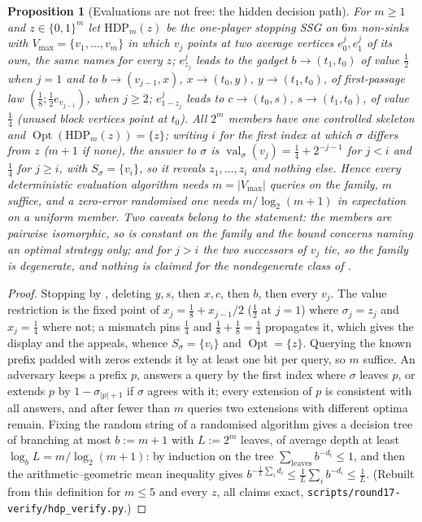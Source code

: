 \documentclass[11pt]{article}
\theoremstyle{plain}
\newtheorem{proposition}[theorem]{Proposition}
\theoremstyle{definition}
\DeclareMathOperator{\val}{val}
\DeclareMathOperator{\Opt}{Opt}
\newcommand{\Vmax}{V_{\max}}
\begin{document}
\begin{proposition}[Evaluations are not free: the hidden decision path]\label{prop:hdp-eval}
For $m\ge1$ and $z\in\{0,1\}^{m}$ let $\mathrm{HDP}_m(z)$ be the one-player
stopping SSG on $6m$ non-sinks with $\Vmax=\{v_1,\dots,v_m\}$ in which $v_j$
points at two average vertices $e^{j}_0,e^{j}_1$ of its own, the same names
for every $z$; $e^{j}_{z_j}$ leads to the gadget $b\to(t_1,t_0)$ of value
$\tfrac12$ when $j=1$ and to $b\to(v_{j-1},x)$, $x\to(t_0,y)$,
$y\to(t_1,t_0)$, of first-passage law $(\tfrac18;\tfrac12e_{v_{j-1}})$,
when $j\ge2$; $e^{j}_{1-z_j}$ leads to $c\to(t_0,s)$, $s\to(t_1,t_0)$, of
value $\tfrac14$ (unused block vertices point at $t_0$). All $2^{m}$
members have one controlled skeleton and $\Opt(\mathrm{HDP}_m(z))=\{z\}$;
writing $i$ for the first index at which $\sigma$ differs from $z$
($m+1$ if none), the answer to $\sigma$ is $\val_\sigma(v_j)=\tfrac14+2^{-j-1}$
for $j<i$ and $\tfrac14$ for $j\ge i$, with $S_\sigma=\{v_i\}$, so it
reveals $z_1,\dots,z_i$ and nothing else. Hence every deterministic
evaluation algorithm needs $m=|\Vmax|$ queries on the family, $m$ suffice,
and a zero-error randomised one needs $m/\log_2(m+1)$ in expectation on a
uniform member. Two caveats belong to the statement: the members are
pairwise isomorphic, so  is constant on the family and
the bound concerns naming an optimal strategy only; and for $j>i$ the two
successors of $v_j$ tie, so the family is degenerate, and nothing is
claimed for the nondegenerate class of .
\end{proposition}

\begin{proof}
Stopping by , deleting $y,s$, then $x,c$, then $b$,
then every $v_j$. The value restriction is the fixed point of
$x_j=\tfrac18+x_{j-1}/2$ ($\tfrac12$ at $j=1$) where $\sigma_j=z_j$ and
$x_j=\tfrac14$ where not; a mismatch pins $\tfrac14$ and
$\tfrac18+\tfrac18=\tfrac14$ propagates it, which gives the display and the
appeals, whence $S_\sigma=\{v_i\}$ and $\Opt=\{z\}$. Querying the known
prefix padded with zeros extends it by at least one bit per query, so $m$
suffice. An adversary keeps a prefix $p$, answers a query by the first
index where $\sigma$ leaves $p$, or extends $p$ by $1-\sigma_{|p|+1}$ if
$\sigma$ agrees with it; every extension of $p$ is consistent with all
answers, and after fewer than $m$ queries two extensions with different
optima remain. Fixing the random string of a randomised algorithm gives a
decision tree of branching at most $b:=m+1$ with $L:=2^{m}$ leaves, of
average depth at least $\log_bL=m/\log_2(m+1)$: by induction on the tree
$\sum_{\text{leaves}}b^{-d_i}\le1$, and then the arithmetic--geometric
mean inequality gives $b^{-\frac1L\sum_id_i}\le\frac1L\sum_ib^{-d_i}\le\frac1L$. (Rebuilt from this definition for
$m\le5$ and every $z$, all claims exact,
\texttt{scripts/round17-verify/hdp\_verify.py}.)
\end{proof}
\end{document}

